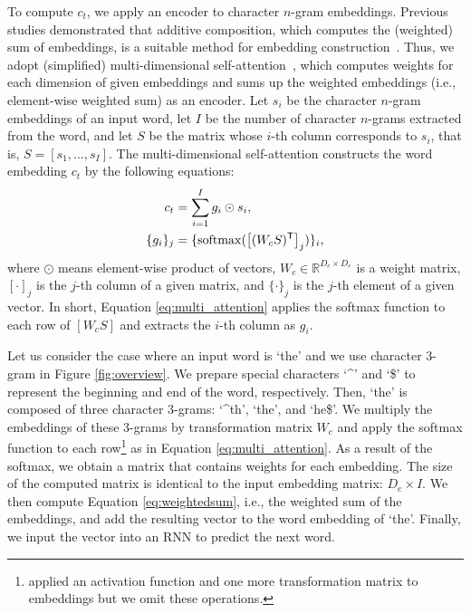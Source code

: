 \documentclass[letterpaper]{article} %
\begin{document}
To compute $c_t$, we apply an encoder to character $n$-gram embeddings.
Previous studies demonstrated that additive composition, which computes the (weighted) sum of embeddings, is a suitable method for embedding construction~\cite{takase-okazaki-inui:2016:P16-1,wieting-EtAl:2016:EMNLP2016}.
Thus, we adopt (simplified) multi-dimensional self-attention~\cite{shen2018disan}, which computes weights for each dimension of given embeddings and sums up the weighted embeddings (i.e., element-wise weighted sum) as an encoder.
Let $s_i$ be the character $n$-gram embeddings of an input word, let $I$ be the number of character $n$-grams extracted from the word, and let $S$ be the matrix whose $i$-th column corresponds to $s_i$, that is, $S = \left[ s_1, ..., s_I \right]$.
The multi-dimensional self-attention constructs the word embedding $c_t$ by the following equations:
\begin{align}
  c_t &= \sum_{i=1}^{I} g_i \odot s_i, \label{eq:weightedsum} \\
  \{ g_i \}_j &= \{ {\rm softmax}( \left[ (W_c S)^{\mathsf{T}} \right]_{j} ) \}_i, \label{eq:multi_attention}
\end{align}
where $\odot$ means element-wise product of vectors, $W_c \in \mathbb{R}^{D_e \times D_e}$ is a weight matrix, $\left[ \cdot \right]_{j}$ is the $j$-th column of a given matrix, and $\{ \cdot \}_j$ is the $j$-th element of a given vector.
In short, Equation \ref{eq:multi_attention} applies the softmax function to each row of $\left[W_c S \right]$ and extracts the $i$-th column as $g_i$.




Let us consider the case where an input word is `the' and we use character 3-gram in Figure \ref{fig:overview}.
We prepare special characters `\^{}' and `\$' to represent the beginning and end of the word, respectively.
Then, `the' is composed of three character 3-grams: `\^{}th', `the', and `he\$'.
We multiply the embeddings of these 3-grams by transformation matrix $W_c$ and apply the softmax function to each row\footnote{\cite{shen2018disan} applied an activation function and one more transformation matrix to embeddings but we omit these operations.} as in Equation \ref{eq:multi_attention}.
As a result of the softmax, we obtain a matrix that contains weights for each embedding.
The size of the computed matrix is identical to the input embedding matrix: $D_e \times I$.
We then compute Equation \ref{eq:weightedsum}, i.e., the weighted sum of the embeddings, and add the resulting vector to the word embedding of `the'.
Finally, we input the vector into an RNN to predict the next word.
\end{document}
